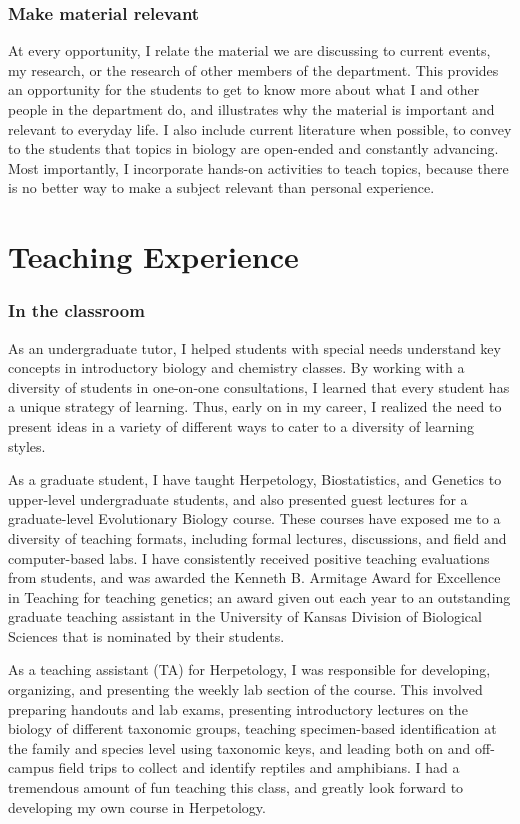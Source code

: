 \documentclass[10pt]{article}
\begin{document}
\subsubsection*{Make material relevant}
At every opportunity, I relate the material we are discussing to current
events, my research, or the research of other members of the department.
This provides an opportunity for the students to get to know more about what I
and other people in the department do, and illustrates why the material is
important and relevant to everyday life.
I also include current literature when possible, to convey to the students that
topics in biology are open-ended and constantly advancing.
Most importantly, I incorporate hands-on activities to teach topics, because
there is no better way to make a subject relevant than personal experience.

\section*{Teaching Experience}
\subsubsection*{In the classroom}
As an undergraduate tutor, I helped students with special needs understand key
concepts in introductory biology and chemistry classes.
By working with a diversity of students in one-on-one consultations, I learned
that every student has a unique strategy of learning.
Thus, early on in my career, I realized the need to present ideas in a variety
of different ways to cater to a diversity of learning styles.

As a graduate student, I have taught Herpetology, Biostatistics, and Genetics
to upper-level undergraduate students, and also presented guest lectures for a
graduate-level Evolutionary Biology course.
These courses have exposed me to a diversity of teaching formats, including
formal lectures, discussions, and field and computer-based labs.
I have consistently received positive teaching evaluations from students, and
was awarded the Kenneth B. Armitage Award for Excellence in Teaching for
teaching genetics; an award given out each year to an outstanding graduate
teaching assistant in the University of Kansas Division of Biological Sciences
that is nominated by their students.

As a teaching assistant (TA) for Herpetology, I was responsible for developing,
organizing, and presenting the weekly lab section of the course.
This involved preparing handouts and lab exams, presenting introductory
lectures on the biology of different taxonomic groups, teaching specimen-based
identification at the family and species level using taxonomic keys, and
leading both on and off-campus field trips to collect and identify reptiles and
amphibians.
I had a tremendous amount of fun teaching this class, and greatly look forward
to developing my own course in Herpetology.
\end{document}
